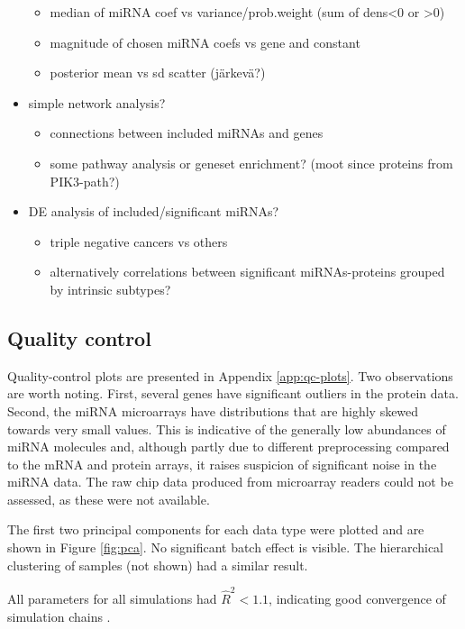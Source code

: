 \begin{itemize}
\begin{itemize}
    \item median of miRNA coef vs variance/prob.weight (sum of dens<0 or >0)
    \item magnitude of chosen miRNA coefs vs gene and constant
    \item posterior mean vs sd scatter (järkevä?)
  \end{itemize}
  \item simple network analysis?
  \begin{itemize}
    \item connections between included miRNAs and genes
    \item some pathway analysis or geneset enrichment? (moot since proteins from PIK3-path?)
  \end{itemize}
  \item DE analysis of included/significant miRNAs?
  \begin{itemize}
    \item triple negative cancers vs others
    \item alternatively correlations between significant miRNAs-proteins grouped by intrinsic subtypes?
  \end{itemize}
\end{itemize}

\subsection{Quality control}

Quality-control plots are presented in Appendix \ref{app:qc-plots}. Two
observations are worth noting. First, several genes have significant outliers
in the protein data. Second, the miRNA microarrays have distributions that are
highly skewed towards very small values. This is indicative of the generally
low abundances of miRNA molecules and, although partly due to different
preprocessing compared to the mRNA and protein arrays, it raises suspicion of
significant noise in the miRNA data. The raw chip data produced from
microarray readers could not be assessed, as these were not available.

The first two principal components for each data type were plotted and are
shown in Figure \ref{fig:pca}. No significant batch effect is visible. The
hierarchical clustering of samples (not shown) had a similar result.


All parameters for all simulations had $\hat{R}^2 < 1.1$, indicating
good convergence of simulation chains \citep{Gelman2013}.

